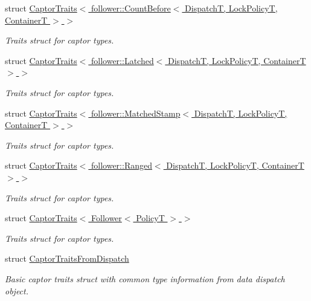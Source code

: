 \begin{DoxyCompactItemize}
struct \hyperlink{structflow_1_1_captor_traits_3_01follower_1_1_count_before_3_01_dispatch_t_00_01_lock_policy_t_00_01_container_t_01_4_01_4}{Captor\+Traits$<$ follower\+::\+Count\+Before$<$ Dispatch\+T, Lock\+Policy\+T, Container\+T $>$ $>$}
\begin{DoxyCompactList}\small\item\em Traits struct for captor types. \end{DoxyCompactList}\item 
struct \hyperlink{structflow_1_1_captor_traits_3_01follower_1_1_latched_3_01_dispatch_t_00_01_lock_policy_t_00_01_container_t_01_4_01_4}{Captor\+Traits$<$ follower\+::\+Latched$<$ Dispatch\+T, Lock\+Policy\+T, Container\+T $>$ $>$}
\begin{DoxyCompactList}\small\item\em Traits struct for captor types. \end{DoxyCompactList}\item 
struct \hyperlink{structflow_1_1_captor_traits_3_01follower_1_1_matched_stamp_3_01_dispatch_t_00_01_lock_policy_t_00_01_container_t_01_4_01_4}{Captor\+Traits$<$ follower\+::\+Matched\+Stamp$<$ Dispatch\+T, Lock\+Policy\+T, Container\+T $>$ $>$}
\begin{DoxyCompactList}\small\item\em Traits struct for captor types. \end{DoxyCompactList}\item 
struct \hyperlink{structflow_1_1_captor_traits_3_01follower_1_1_ranged_3_01_dispatch_t_00_01_lock_policy_t_00_01_container_t_01_4_01_4}{Captor\+Traits$<$ follower\+::\+Ranged$<$ Dispatch\+T, Lock\+Policy\+T, Container\+T $>$ $>$}
\begin{DoxyCompactList}\small\item\em Traits struct for captor types. \end{DoxyCompactList}\item 
struct \hyperlink{structflow_1_1_captor_traits_3_01_follower_3_01_policy_t_01_4_01_4}{Captor\+Traits$<$ Follower$<$ Policy\+T $>$ $>$}
\begin{DoxyCompactList}\small\item\em Traits struct for captor types. \end{DoxyCompactList}\item 
struct \hyperlink{structflow_1_1_captor_traits_from_dispatch}{Captor\+Traits\+From\+Dispatch}
\begin{DoxyCompactList}\small\item\em Basic captor traits struct with common type information from data dispatch object. \end{DoxyCompactList}\item 

\end{DoxyCompactItemize}
